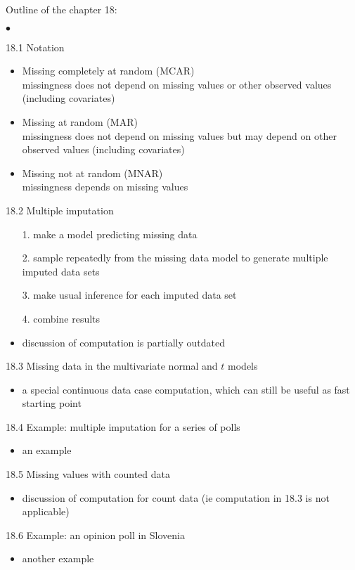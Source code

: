 \documentclass[a4paper,11pt]{article}
\begin{document}
\vspace{\baselineskip}
\noindent
Outline of the chapter 18:
\begin{list}{$\bullet$}{\parsep=0pt\itemsep=2pt}
  \item[18.1] Notation
    \begin{itemize}
    \item Missing completely at random (MCAR)\\
      missingness does not depend on missing values or other observed
      values (including covariates)
    \item Missing at random (MAR)\\
      missingness does not depend on missing values but may depend on
      other observed values (including covariates)
    \item Missing not at random (MNAR)\\
      missingness depends on missing values
    \end{itemize}
  \item[18.2] Multiple imputation
    \begin{itemize}
    \item[1.] make a model predicting missing data
    \item[2.] sample repeatedly from the missing data model to generate
      multiple imputed data sets
    \item[3.] make usual inference for each imputed data set
    \item[4.] combine results
    \item discussion of computation is partially outdated
    \end{itemize}
  \item[18.3] Missing data in the multivariate normal and $t$ models
    \begin{itemize}
    \item a special continuous data case computation, which can still
      be useful as fast starting point
    \end{itemize}
  \item[18.4] Example: multiple imputation for a series of polls
    \begin{itemize}
    \item an example
    \end{itemize}
  \item[18.5] Missing values with counted data
    \begin{itemize}
    \item discussion of computation for count data (ie computation in
      18.3 is not applicable)
    \end{itemize}
  \item[18.6] Example: an opinion poll in Slovenia
    \begin{itemize}
    \item another example
    \end{itemize}
\end{list}
\end{document}
